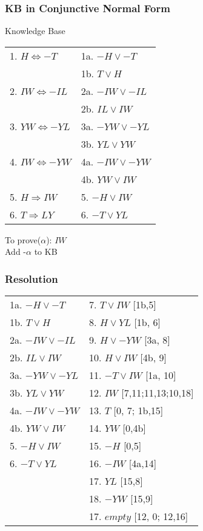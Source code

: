 \documentclass[compress, 9pt]{beamer}
\begin{document}
\begin{frame}
\frametitle{KB in Conjunctive Normal Form}
\label{sec-3-3}


Knowledge Base\\

\begin{center}
\begin{tabular}{ll}
 1. $H \Leftrightarrow -T$    &  1a. $-H \vee -T$    \\
                              &  1b. $T \vee H$      \\
 2. $IW \Leftrightarrow -IL$  &  2a. $-IW \vee -IL$  \\
                              &  2b. $IL \vee IW$    \\
 3. $YW \Leftrightarrow -YL$  &  3a. $-YW \vee -YL$  \\
                              &  3b. $YL \vee YW$    \\
 4. $IW \Leftrightarrow -YW$  &  4a. $-IW \vee -YW$  \\
                              &  4b. $YW \vee IW$    \\
 5. $H \Rightarrow IW$        &  5. $-H \vee IW$     \\
 6. $T \Rightarrow LY$        &  6. $-T \vee YL$     \\
\end{tabular}
\end{center}



To prove($\alpha$): $IW$ \\
Add -$\alpha$ to KB
\end{frame}
\begin{frame}
\frametitle{Resolution}
\label{sec-3-4}


\begin{center}
\begin{tabular}{ll}
 1a. $-H \vee -T$    &  7. $T \vee IW$ [1b,5]        \\
 1b. $T \vee H$      &  8. $H \vee YL$ [1b, 6]       \\
 2a. $-IW \vee -IL$  &  9. $H \vee -YW$ [3a, 8]      \\
 2b. $IL \vee IW$    &  10. $H \vee IW$ [4b, 9]      \\
 3a. $-YW \vee -YL$  &  11. $-T \vee IW$ [1a, 10]    \\
 3b. $YL \vee YW$    &  12. $IW$ [7,11;11,13;10,18]  \\
 4a. $-IW \vee -YW$  &  13. $T$ [0, 7; 1b,15]        \\
 4b. $YW \vee IW$    &  14. $YW$ [0,4b]              \\
 5. $-H \vee IW$     &  15. $-H$ [0,5]               \\
 6. $-T \vee YL$     &  16. $-IW$ [4a,14]            \\
                     &  17. $YL$ [15,8]              \\
                     &  18. $-YW$ [15,9]             \\
                     &  17. $empty$ [12, 0; 12,16]   \\
\end{tabular}
\end{center}
\end{frame}
\end{document}
